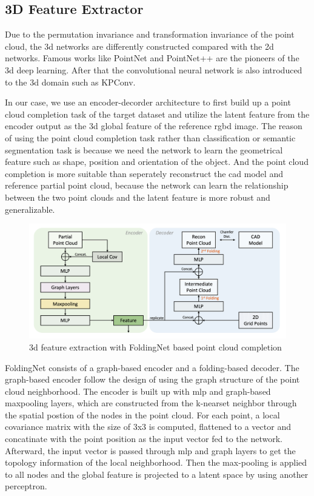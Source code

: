 \documentclass[12pt,DIV14,BCOR12mm,a4paper,footinclude=false,headinclude,parskip=half-,twoside,openright,cleardoublepage=empty,toc=index,bibliography=totoc,listof=totoc]{scrreprt}
\numberwithin{equation}{chapter}
\begin{document}
\subsection{3D Feature Extractor}
Due to the permutation invariance and transformation invariance of the point cloud, the \gls{3d} networks are differently constructed compared with the \gls{2d} networks. Famous works like PointNet\cite{qi2017pointnet} and PointNet++\cite{qi2017pointnet++} are the pioneers of the \gls{3d} deep learning. After that the convolutional neural network is also introduced to the \gls{3d} domain such as KPConv\cite{thomas2019kpconv}. 

In our case, we use an encoder-decorder architecture to first build up a point cloud completion task of the target dataset and utilize the latent feature from the encoder output as the \gls{3d} global feature of the reference \gls{rgbd} image. The reason of using the point cloud completion task rather than classification or semantic segmentation task is because we need the network to learn the geometrical feature such as shape, position and orientation of the object. And the point cloud completion is more suitable than seperately reconstruct the \gls{cad} model and reference partial point cloud, because the network can learn the relationship between the two point clouds and the latent feature is more robust and generalizable.
\begin{figure}[h]
	\centering
	\includegraphics[scale=.2]{img/fold.png}
	\caption{\gls{3d} feature extraction with FoldingNet based point cloud completion}
	\label{img:fold}
\end{figure}

FoldingNet consists of a graph-based encoder and a folding-based decoder. The graph-based encoder follow the design of \cite{shen2018mining} using the graph structure of the point cloud neighborhood. The encoder is built up with \gls{mlp} and graph-based maxpooling layers, which are constructed from the k-nearset neighbor through the spatial postion of the nodes in the point cloud. For each point, a local covariance matrix with the size of 3x3 is computed, flattened to a vector and concatinate with the point position as the input vector fed to the network. Afterward, the input vector is passed through \gls{mlp} and graph layers to get the topology information of the local neighborhood. Then the max-pooling is applied to all nodes and the global feature is projected to a latent space by using another perceptron.
\end{document}
